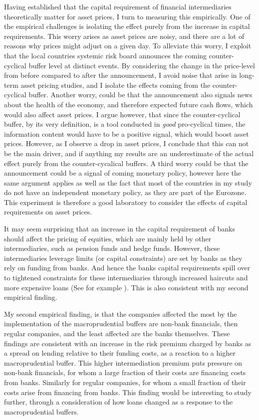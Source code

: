 \documentclass[11pt]{article}
\begin{document}
Having established that the capital requirement of financial intermediaries theoretically matter for asset prices, I turn to measuring this empirically. One of the empirical challenges is isolating the effect purely from the increase in capital requirements. This worry arises as asset prices are noisy, and there are a lot of reasons why prices might adjust on a given day. To alleviate this worry, I exploit that the local countries systemic risk board announces the coming counter-cyclical buffer level at distinct events. By considering the change in the price-level from before compared to after the announcement, I avoid noise that arise in long-term asset pricing studies, and I isolate the effects coming from the counter-cyclical buffer. Another worry, could be that the announcement also signals news about the health of the economy, and therefore expected future cash flows, which would also affect asset prices. I argue however, that since the counter-cyclical buffer, by its very definition, is a tool conducted in \emph{good} pro-cyclical times, the information content would have to be a positive signal, which would boost asset prices. However, as I observe a drop in asset prices, I conclude that this can not be the main driver, and if anything my results are an underestimate of the actual effect purely from the counter-cycalical buffers. A third worry could be that the announcement could be a signal of coming monetary policy, however here the same argument applies as well as the fact that most of the countries in my study do not have an independent monetary policy, as they are part of the Eurozone. This experiment is therefore a good laboratory to consider the effects of capital requirements on asset prices.

It may seem surprising that an increase in the capital requirement of banks should affect the pricing of equities, which are mainly held by other intermediaries, such as pension funds and hedge funds. However, these intermediaries leverage limits (or capital constraints) are set by banks as they rely on funding from banks. And hence the banks capital requirements spill over to tightened constraints for these intermediaries through increased haircuts and more expensive loans (See for example \citealt{Brunnermeier2009}). This is also consistent with my second empirical finding.

My second empirical finding, is that the companies affected the most by the implementation of the macroprudential buffers are non-bank financials, then regular companies, and the least affected are the banks themselves. These findings are consistent with an increase in the risk premium charged by banks as a spread on lending relative to their funding costs, as a reaction to a higher macroprudential buffer. This higher intermediation premium puts pressure on non-bank financials, for whom a large fraction of their costs are financing costs from banks. Similarly for regular companies, for whom a small fraction of their costs arise from financing from banks. This finding would be interesting to study further, through a consideration of how loans changed as a response to the macroprudential buffers. 
\end{document}
